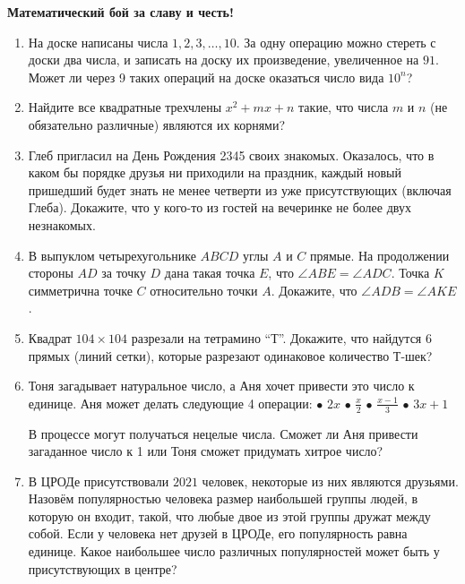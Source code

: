 \documentclass{article}
\begin{document}
\large
	

\begin{center}
\textbf{Математический бой за славу и честь!}
\end{center}

\begin{enumerate}

\item На доске написаны числа $1, 2, 3, \dotso, 10$. За одну операцию можно стереть с доски два числа, и записать на доску их произведение, увеличенное на $91$. Может ли через 9 таких операций на доске оказаться число вида $10^n$?

\item Найдите все квадратные трехчлены $x^2 + mx + n$ такие, что числа $m$ и $n$ (не обязательно различные) являются их корнями?

\item Глеб пригласил на День Рождения 2345 своих знакомых. Оказалось, что в каком бы порядке друзья ни приходили на праздник, каждый новый пришедший будет знать не менее четверти из уже присутствующих (включая Глеба). Докажите, что у кого-то из гостей на вечеринке не более двух незнакомых.

\item В выпуклом четырехугольнике $ABCD$ углы $A$ и $C$ прямые. На продолжении стороны $AD$ за точку $D$ дана такая точка $E$, что $\angle ABE = \angle ADC$. Точка $K$ симметрична точке $C$ относительно точки $A$. Докажите, что $\angle ADB = \angle AKE$.

\item Квадрат $104 \times 104$ разрезали на тетрамино “Т”. Докажите, что найдутся 6 прямых (линий сетки), которые разрезают одинаковое количество Т-шек?

\item Тоня загадывает натуральное число, а Аня хочет привести это число к единице. Аня может делать следующие 4 операции: $\bullet$ $2x$ $\bullet$ $ \frac{x}{2}$ $\bullet$ $\frac{x-1}{3}$ $\bullet$ $3x+1$

В процессе могут получаться нецелые числа. Сможет ли Аня привести загаданное число к 1 или Тоня сможет придумать хитрое число?

\item В ЦРОДе присутствовали $2021$ человек, некоторые из них являются друзьями. Назовём популярностью человека размер наибольшей группы людей, в которую он входит, такой, что любые двое из этой группы дружат между собой. Если у человека нет друзей в ЦРОДе, его популярность равна единице. Какое наибольшее число различных популярностей может быть у присутствующих в центре?


\end{enumerate}
\end{document}
